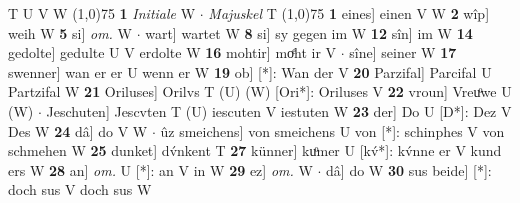 \documentclass[8pt,a4paper,notitlepage]{article}
\begin{document}
\begin{table}[ht]
\begin{minipage}[t]{0.5\linewidth}
T U V W \newline
\line(1,0){75} \newline
\textbf{1} \textit{Initiale} W   $\cdot$ \textit{Majuskel} T  \newline
\line(1,0){75} \newline
\textbf{1} eines] einen V W \textbf{2} wîp] weih W \textbf{5} si] \textit{om.} W  $\cdot$ wart] wartet W \textbf{8} si] sy gegen im W \textbf{12} sîn] im W \textbf{14} gedolte] gedulte U V erdolte W \textbf{16} mohtir] moͤht ir V  $\cdot$ sîne] seiner W \textbf{17} swenner] wan er er U wenn er W \textbf{19} ob] [*]: Wan der V \textbf{20} Parzifal] Parcifal U Partzifal W \textbf{21} Oriluses] Orilvs T (U) (W) [Ori*]: Oriluses  V \textbf{22} vroun] Vreuͦwe U (W)  $\cdot$ Jeschuten] Jescvten T (U) iescuten V iestuten W \textbf{23} der] Do U [D*]: Dez V Des W \textbf{24} dâ] do V W  $\cdot$ ûz smeichens] von smeichens U von [*]: schinphes V von schmehen W \textbf{25} dunket] dv́nkent T \textbf{27} künner] kuͦmer U [kv́*]: kv́nne er V kund ers W \textbf{28} an] \textit{om.} U [*]: an V in W \textbf{29} ez] \textit{om.} W  $\cdot$ dâ] do W \textbf{30} sus beide] [*]: doch sus V doch sus W \newline
\end{minipage}
\end{table}
\end{document}
